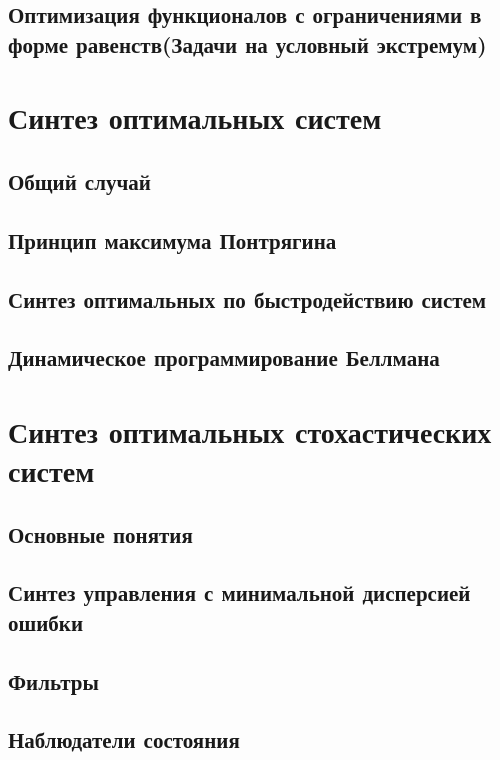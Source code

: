 \documentclass[preprint,russian,a5paper,10pt,twoside,mediummath]{ncc}
\begin{document}
\subsection{Оптимизация функционалов с ограничениями в форме равенств(Задачи на условный экстремум)\label{variations:conditional_extremum}}

 

\clearpage
  \section{Синтез оптимальных систем\label{synthesis}}
 \subsection{Общий случай\label{synthesis:general}}
 
 \subsection{Принцип максимума Понтрягина\label{synthesis:principle_of_maximum}}
 
 \subsection{Синтез оптимальных по быстродействию систем\label{synthesis:fastest}}
 
 \subsection{Динамическое программирование Беллмана\label{synthesis:dyn_prog}}
  
  \clearpage
  \section{Синтез оптимальных стохастических систем\label{stochastic}}
 \subsection{Основные понятия\label{stochastic:general}}
 
 \subsection{Синтез управления с минимальной дисперсией ошибки\label{stochastic:min_error_dispersion}}
 
 \subsection{Фильтры\label{stochastic:filters}}
 
 \subsection{Наблюдатели состояния\label{stochastic:observers}}
\end{document}
